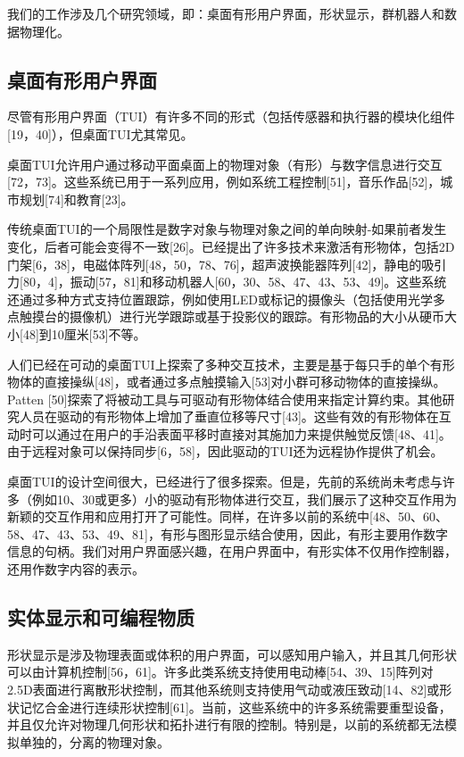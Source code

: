 我们的工作涉及几个研究领域，即：桌面有形用户界面，形状显示，群机器人和数据物理化。

\subsection{桌面有形用户界面}

尽管有形用户界面（TUI）有许多不同的形式（包括传感器和执行器的模块化组件[19，40]），但桌面TUI尤其常见。

桌面TUI允许用户通过移动平面桌面上的物理对象（有形）与数字信息进行交互[72，73]。这些系统已用于一系列应用，例如系统工程控制[51]，音乐作品[52]，城市规划[74]和教育[23]。

传统桌面TUI的一个局限性是数字对象与物理对象之间的单向映射-如果前者发生变化，后者可能会变得不一致[26]。已经提出了许多技术来激活有形物体，包括2D门架[6，38]，电磁体阵列[48，50，78、76]，超声波换能器阵列[42]，静电的吸引力[80，4]，振动[57，81]和移动机器人[60，30、58、47、43、53、49]。这些系统还通过多种方式支持位置跟踪，例如使用LED或标记的摄像头（包括使用光学多点触摸台的摄像机）进行光学跟踪或基于投影仪的跟踪。有形物品的大小从硬币大小[48]到10厘米[53]不等。

人们已经在可动的桌面TUI上探索了多种交互技术，主要是基于每只手的单个有形物体的直接操纵[48]，或者通过多点触摸输入[53]对小群可移动物体的直接操纵。 Patten [50]探索了将被动工具与可驱动有形物体结合使用来指定计算约束。其他研究人员在驱动的有形物体上增加了垂直位移等尺寸[43]。这些有效的有形物体在互动时可以通过在用户的手沿表面平移时直接对其施加力来提供触觉反馈[48、41]。由于远程对象可以保持同步[6，58]，因此驱动的TUI还为远程协作提供了机会。

桌面TUI的设计空间很大，已经进行了很多探索。但是，先前的系统尚未考虑与许多（例如10、30或更多）小的驱动有形物体进行交互，我们展示了这种交互作用为新颖的交互作用和应用打开了可能性。同样，在许多以前的系统中[48、50、60、58、47、43、53、49、81]，有形与图形显示结合使用，因此，有形主要用作数字信息的句柄。我们对用户界面感兴趣，在用户界面中，有形实体不仅用作控制器，还用作数字内容的表示。

\subsection{实体显示和可编程物质}

形状显示是涉及物理表面或体积的用户界面，可以感知用户输入，并且其几何形状可以由计算机控制[56，61]。许多此类系统支持使用电动棒[54、39、15]阵列对2.5D表面进行离散形状控制，而其他系统则支持使用气动或液压致动[14、82]或形状记忆合金进行连续形状控制[61]。当前，这些系统中的许多系统需要重型设备，并且仅允许对物理几何形状和拓扑进行有限的控制。特别是，以前的系统都无法模拟单独的，分离的物理对象。


